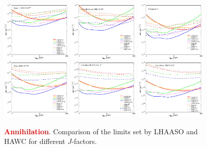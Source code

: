 \documentclass[aps,prd,amsmath,amssymb,showpacs,floats,floatfix,nofootinbib,reprint]{revtex4-1}
\def\red#1{{\textcolor{red}{#1}}} %
\begin{document}
\begin{figure}%
\caption{\red{\bf Annihilation}. Comparison of the limits set by LHAASO and HAWC for different $J$-factors.}
{\includegraphics[width=0.3\textwidth]{comparison_segue1-ani.eps}}
{\includegraphics[width=0.3\textwidth]{comparison_comab-ani.eps}}
{\includegraphics[width=0.3\textwidth]{comparison_trian2-ani.eps}}
{\includegraphics[width=0.3\textwidth]{comparison_draco-ani.eps}}
{\includegraphics[width=0.3\textwidth]{comparison_urmajor2-ani.eps}}
{\includegraphics[width=0.3\textwidth]{comparison_urminor-ani.eps}}
\end{figure}
\end{document}

